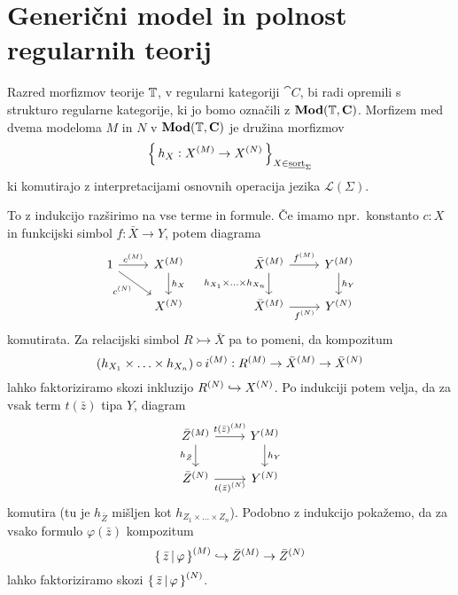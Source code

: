 \documentclass[../kategoricna_logika.tex]{subfiles}
\begin{document}
  \section{Generični model in polnost regularnih teorij}
  \begin{definicija}
    Razred morfizmov teorije $\T$, v regularni kategoriji $\cat{C}$, bi
    radi opremili s strukturo regularne kategorije, ki jo bomo
    označili z $\Mod(\T, \cat{C})$. Morfizem med dvema modeloma $M$ in
    $N$ v $\Mod(\T, \cat{C})$ je družina morfizmov
$$\set{h_X : \interp{X} \to \interp[N]{X}}_{X \in \underline{\mathrm{sort}}_\Sigma}$$
ki komutirajo z interpretacijami osnovnih operacija jezika
$\mathcal{L}(\Sigma)$.
\end{definicija}
To z indukcijo razširimo na vse terme in formule. Če imamo npr.\
konstanto $c:X$ in funkcijski simbol $f:\bar{X} \to Y$, potem diagrama
\begin{equation*}
  \begin{tikzcd}
    1 \ar[dr, "c^{(N)}"'] \ar[r, "\interp{c}"] & \interp{X} \ar[d, "h_X"]  &&  \interp{\bar{X}} \ar[d, "h_{X_1} \times \ldots \times h_{X_n}"'] \ar[r, "\interp{f}"] & \interp{Y} \ar[d, "h_Y"]\\
    & \interp[N]{X} && \interp{\bar{X}} \ar[r, "{\interp[N]{f}}"'] &
    \interp[N]{Y}
  \end{tikzcd}
\end{equation*}
komutirata. Za relacijski simbol $R \rightarrowtail \bar{X}$ pa to
pomeni, da kompozitum
$$(h_{X_1} \times \ldots \times h_{X_n}) \circ \interp{i} : \interp{R} \to \interp{\bar{X}} \to \interp[N]{\bar{X}}$$
lahko faktoriziramo skozi inkluzijo
$\interp[N]{R} \hookrightarrow \interp[N]{X}$.  Po indukciji potem
velja, da za vsak term $t(\bar{z})$ tipa $Y$, diagram
\begin{equation*}
  \begin{tikzcd}
    \interp{\bar{Z}} \ar[d, "h_{\bar{Z}}"'] \ar[r, "{t(\bar{z})^{(M)}}"] & \interp{Y} \ar[d, "h_Y"] \\
    \interp[N]{\bar{Z}} \ar[r, "{\interp[N]{t(\bar{z})}}"'] &
    \interp[N]{Y}
  \end{tikzcd}
\end{equation*}
komutira (tu je $h_{\bar{Z}}$ mišljen kot
$h_{Z_1 \times \ldots \times Z_n}$).  Podobno z indukcijo pokažemo, da
za vsako formulo $\varphi(\bar{z})$ kompozitum
$$\interp{\set{\bar{z} \,\middle|\, \varphi}} \hookrightarrow \interp{\bar{Z}} \to \interp[N]{\bar{Z}}$$
lahko faktoriziramo skozi
$\interp[N]{\set{\bar{z} \,\middle|\, \varphi}}$.
\end{document}
